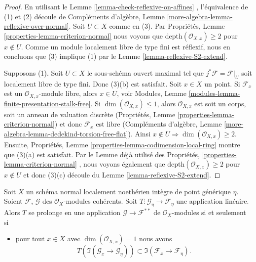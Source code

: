 \begin{proof}
En utilisant le Lemme  \ref{lemma-check-reflexive-on-affines} , l'équivalence de (1) et (2) découle de Compléments
d'algèbre, Lemme  \ref{more-algebra-lemma-reflexive-over-normal}. Soit  $U \subset X$  comme en (3). Par Propriétés, Lemme
 \ref{properties-lemma-criterion-normal}  nous voyons que  $\text{depth}(\mathcal{O}_{X, x}) \geq 2$  pour  $x \not \in U$. Comme un module
localement libre de type fini est réflexif, nous en concluons que (3) implique (1)
par le Lemme  \ref{lemma-reflexive-S2-extend}.

\medskip\noindent
Supposons (1). Soit  $U \subset X$  le sous-schéma ouvert maximal tel que
 $j^*\mathcal{F} = \mathcal{F}|_U$  soit localement libre de type fini. Donc (3)(b) est satisfait. Soit
 $x \in X$  un point. Si  $\mathcal{F}_x$  est un  $\mathcal{O}_{X, x}$-module libre, alors
 $x \in U$, voir Modules, Lemme  \ref{modules-lemma-finite-presentation-stalk-free}. Si  $\dim(\mathcal{O}_{X, x}) \leq 1$, alors
 $\mathcal{O}_{X, x}$  est soit un corps, soit un anneau de valuation discrète (Propriétés,
Lemme  \ref{properties-lemma-criterion-normal}) et donc  $\mathcal{F}_x$  est libre (Compléments d'algèbre, Lemme
 \ref{more-algebra-lemma-dedekind-torsion-free-flat}). Ainsi  $x \not \in U \Rightarrow \dim(\mathcal{O}_{X, x}) \geq 2$. Ensuite, Propriétés, Lemme  \ref{properties-lemma-codimension-local-ring}  montre
que (3)(a) est satisfait. Par le Lemme déjà utilisé des Propriétés,  \ref{properties-lemma-criterion-normal} ,
nous voyons également que  $\text{depth}(\mathcal{O}_{X, x}) \geq 2$  pour  $x \not \in U$  et donc (3)(c) découle du
Lemme  \ref{lemma-reflexive-S2-extend}.
\end{proof}

\begin{lemma}
\label{lemma-describe-reflexive-hull}
Soit  $X$  un schéma normal localement noethérien intègre de point
générique  $\eta$. Soient  $\mathcal{F}$,  $\mathcal{G}$  des  $\mathcal{O}_X$-modules
cohérents. Soit  $T : \mathcal{G}_\eta \to \mathcal{F}_\eta$  une application linéaire. Alors  $T$  se
prolonge en une application  $\mathcal{G} \to \mathcal{F}^{**}$  de  $\mathcal{O}_X$-modules si et seulement
si
\begin{itemize}
\item[(*)] pour tout  $x \in X$  avec  $\dim(\mathcal{O}_{X, x}) = 1$  nous avons
$$
T\left(\Im(\mathcal{G}_x \to \mathcal{G}_\eta)\right) \subset
\Im(\mathcal{F}_x \to \mathcal{F}_\eta).
$$
\end{itemize}
\end{lemma}

